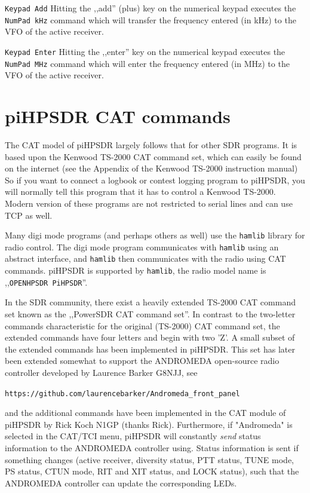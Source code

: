 \documentclass[12pt]{book}
\def\rett#1{\texttt{\color{red}#1}}
\def\bltt#1{\texttt{\color{blue}#1}}
\def\pH{pi\-HPSDR\xspace}
\begin{document}
\rett{Keypad Add} Hitting the ,,add'' (plus) key on the numerical keypad executes the \bltt{NumPad kHz}
command which will transfer the frequency entered (in kHz) to the VFO of the active receiver.

\rett{Keypad Enter} Hitting the ,,enter'' key on the numerical keypad executes the \bltt{NumPad MHz}
command which will enter the frequency entered (in MHz) to the VFO of the active receiver.


\chapter{\pH CAT commands}
\label{sec:catcommands}
The CAT model of \pH largely follows that for other SDR programs. It is based upon the Kenwood TS-2000
CAT command
set, which can easily be found on the internet (see the Appendix of the Kenwood TS-2000 instruction manual)
So if you want to connect a logbook
or contest logging program to \pH, you will normally tell this program that it has to control a Kenwood
TS-2000. Modern version of these programs are not restricted to serial lines and can use TCP as well.

Many digi mode programs (and perhaps others as well) use the \texttt{hamlib} library for radio control. The digi mode
program communicates with \texttt{hamlib} using an abstract interface, and \texttt{hamlib} then communicates with the radio
using CAT commands. \pH is supported by \texttt{hamlib}, the radio model name is ,,\texttt{OPENHPSDR PiHPSDR}''.

In the SDR community, there exist a heavily extended TS-2000 CAT command set known as the ,,PowerSDR CAT
command set''. In contrast to the two-letter commands characteristic for the original (TS-2000) CAT
command set, the extended commands have four letters and begin with two 'Z'.
A small subset of the extended commands  has been implemented in \pH. This set has later been extended
somewhat to support the  ANDROMEDA open-source radio controller developed by Laurence Barker G8NJJ, see

\texttt{https://github.com/laurencebarker/Andromeda\_front\_panel}

and the additional commands have been implemented in
the CAT module of \pH by Rick Koch N1GP (thanks Rick).
Furthermore, if "Andromeda" is selected in the CAT/TCI menu,
\pH will constantly
\textit{send} status information to the ANDROMEDA controller using. Status information is
sent if something
changes (active receiver,  diversity status, PTT status, TUNE mode, PS status, CTUN mode, RIT and XIT
status, and LOCK status),
such that the ANDROMEDA controller can update the corresponding LEDs.
\end{document}
